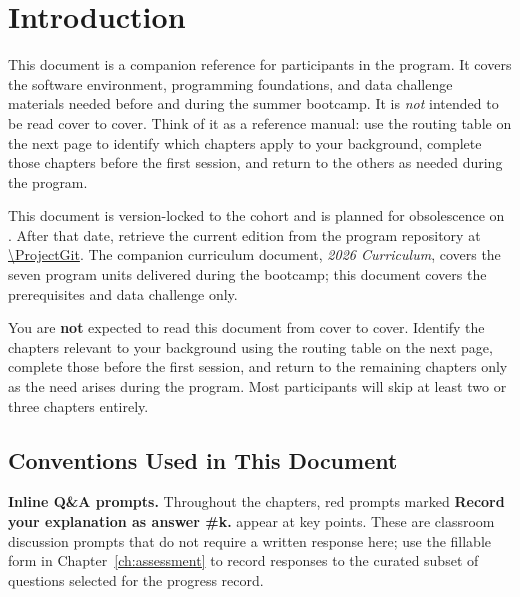 \chapter*{Introduction}

This document is a companion reference for participants in the
\ProjectName{} program. It covers the software environment, programming
foundations, and data challenge materials needed before and during the
summer bootcamp. It is \emph{not} intended to be read cover to cover.
Think of it as a reference manual: use the routing table on the next
page to identify which chapters apply to your background, complete
those chapters before the first session, and return to the others as
needed during the program.

\noindent
This document is version-locked to the \TheDate{} cohort and is
planned for obsolescence on \TheObsolescenceDate{}. After that date,
retrieve the current edition from the program repository at
\url{\ProjectGit}. The companion curriculum document,
\textit{\ProjectName{} 2026 Curriculum}, covers the seven program
units delivered during the bootcamp; this document covers the
prerequisites and data challenge only.

\begin{infobox}%
You are \textbf{not} expected to read this document from cover to cover.
Identify the chapters relevant to your background using the routing
table on the next page, complete those before the first session, and
return to the remaining chapters only as the need arises during the
program. Most participants will skip at least two or three chapters
entirely.
\end{infobox}

\section*{Conventions Used in This Document}

\textbf{Inline Q\&A prompts.} Throughout the chapters, red prompts
marked \textcolor{HW}{\textbf{Record your explanation as answer
\#k.}} appear at key points. These are classroom discussion prompts
that do not require a written response here; use the fillable form in
Chapter~\ref{ch:assessment} to record responses to the curated subset
of questions selected for the progress record.

